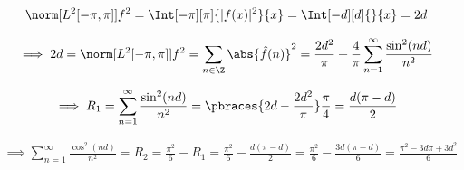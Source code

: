 \begin{solution}
\begin{enumerate}[label = \arabic*.]
    \begin{align*}
        \norm[{L^2[-\pi, \pi]}]{f}^2
        =
        \Int[-\pi][\pi]{|f(x)|^2}{x}
        =
        \Int[-d][d]{}{x}
        =
        2 d
    \end{align*}

    \begin{align*}
        \implies
        2 d
        =
        \norm[{L^2[-\pi, \pi]}]{f}^2
        =
        \sum_{n \in \Z}
        \abs{\hat f(n)}^2
        =
        \frac{2 d^2}{\pi}
        +
        \frac{4}{\pi}
        \sum_{n=1}^\infty
        \frac
        {
            \sin^2(n d)
        }{n^2}
    \end{align*}

    \begin{align*}
        \implies
        R_1
        =
        \sum_{n=1}^\infty
        \frac{\sin^2(n d)}{n^2}
        =
        \pbraces
        {
            2 d
            -
            \frac{2 d^2}{\pi}
        }
        \frac{\pi}{4}
        =
        \frac
        {
            d (\pi - d)
        }{2}
    \end{align*}

    \begin{align*}
        \implies
        \sum_{n=1}^\infty
        \frac{\cos^2(n d)}{n^2}
        =
        R_2
        =
        \frac{\pi^2}{6}
        -
        R_1
        =
        \frac{\pi^2}{6}
        -
        \frac
        {
            d (\pi - d)
        }{2}
        =
        \frac{\pi^2}{6}
        -
        \frac
        {
            3 d (\pi - d)
        }{6}
        =
        \frac
        {
            \pi^2 - 3 d \pi + 3 d^2
        }{6}
    \end{align*}

\end{enumerate}

\end{solution}

